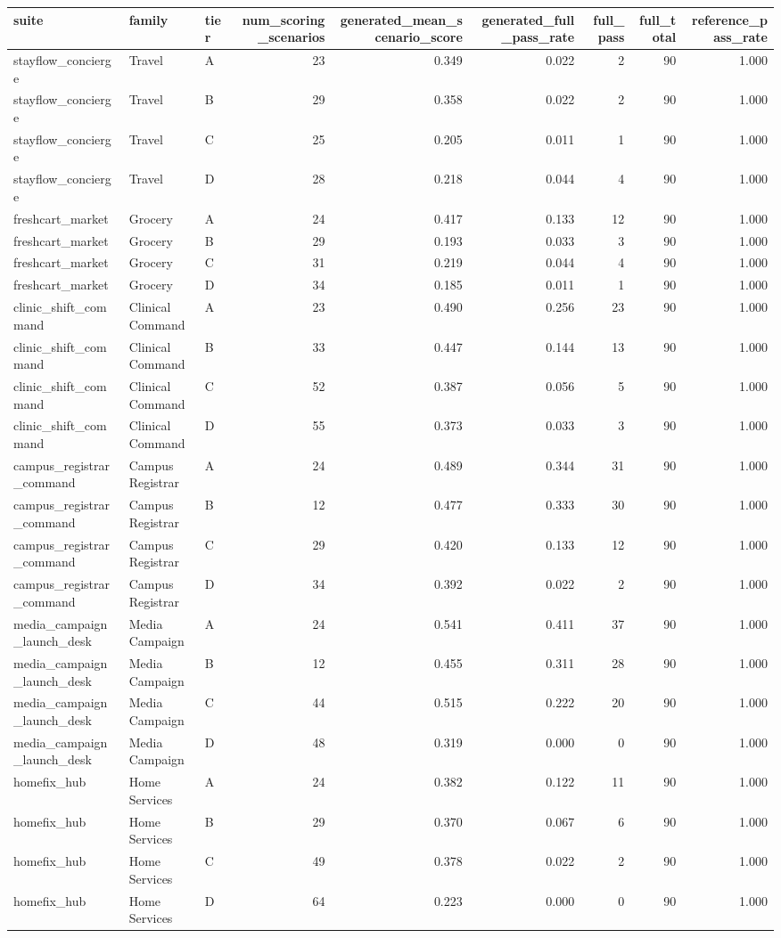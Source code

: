 \begin{tabular}{lllrrrrrr}
\toprule
suite & family & tier & num_scoring_scenarios & generated_mean_scenario_score & generated_full_pass_rate & full_pass & full_total & reference_pass_rate \\
\midrule
stayflow_concierge & Travel & A & 23 & 0.349 & 0.022 & 2 & 90 & 1.000 \\
stayflow_concierge & Travel & B & 29 & 0.358 & 0.022 & 2 & 90 & 1.000 \\
stayflow_concierge & Travel & C & 25 & 0.205 & 0.011 & 1 & 90 & 1.000 \\
stayflow_concierge & Travel & D & 28 & 0.218 & 0.044 & 4 & 90 & 1.000 \\
freshcart_market & Grocery & A & 24 & 0.417 & 0.133 & 12 & 90 & 1.000 \\
freshcart_market & Grocery & B & 29 & 0.193 & 0.033 & 3 & 90 & 1.000 \\
freshcart_market & Grocery & C & 31 & 0.219 & 0.044 & 4 & 90 & 1.000 \\
freshcart_market & Grocery & D & 34 & 0.185 & 0.011 & 1 & 90 & 1.000 \\
clinic_shift_command & Clinical Command & A & 23 & 0.490 & 0.256 & 23 & 90 & 1.000 \\
clinic_shift_command & Clinical Command & B & 33 & 0.447 & 0.144 & 13 & 90 & 1.000 \\
clinic_shift_command & Clinical Command & C & 52 & 0.387 & 0.056 & 5 & 90 & 1.000 \\
clinic_shift_command & Clinical Command & D & 55 & 0.373 & 0.033 & 3 & 90 & 1.000 \\
campus_registrar_command & Campus Registrar & A & 24 & 0.489 & 0.344 & 31 & 90 & 1.000 \\
campus_registrar_command & Campus Registrar & B & 12 & 0.477 & 0.333 & 30 & 90 & 1.000 \\
campus_registrar_command & Campus Registrar & C & 29 & 0.420 & 0.133 & 12 & 90 & 1.000 \\
campus_registrar_command & Campus Registrar & D & 34 & 0.392 & 0.022 & 2 & 90 & 1.000 \\
media_campaign_launch_desk & Media Campaign & A & 24 & 0.541 & 0.411 & 37 & 90 & 1.000 \\
media_campaign_launch_desk & Media Campaign & B & 12 & 0.455 & 0.311 & 28 & 90 & 1.000 \\
media_campaign_launch_desk & Media Campaign & C & 44 & 0.515 & 0.222 & 20 & 90 & 1.000 \\
media_campaign_launch_desk & Media Campaign & D & 48 & 0.319 & 0.000 & 0 & 90 & 1.000 \\
homefix_hub & Home Services & A & 24 & 0.382 & 0.122 & 11 & 90 & 1.000 \\
homefix_hub & Home Services & B & 29 & 0.370 & 0.067 & 6 & 90 & 1.000 \\
homefix_hub & Home Services & C & 49 & 0.378 & 0.022 & 2 & 90 & 1.000 \\
homefix_hub & Home Services & D & 64 & 0.223 & 0.000 & 0 & 90 & 1.000 \\
\bottomrule
\end{tabular}
